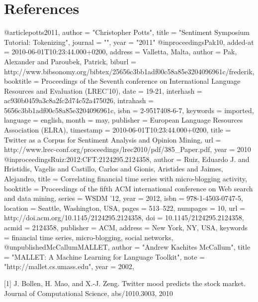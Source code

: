 \documentclass[letterpaper]{article}
\begin{document}
\section{References}
\begin{thebibliography}{99}
@article{potts2011,
    author    = "Christopher Potts",
    title     = "Sentiment Symposium Tutorial: Tokenizing",
    journal   = "",
    year      = "2011"
}
@inproceedings{Pak10,
  added-at = {2010-06-01T10:23:44.000+0200},
  address = {Valletta, Malta},
  author = {Pak, Alexander and Paroubek, Patrick},
  biburl = {http://www.bibsonomy.org/bibtex/25656c3bb1adf00c58a85e3204096961c/frederik},
  booktitle = {Proceedings of the Seventh conference on International Language Resources and Evaluation (LREC'10)},
  date = {19-21},
  interhash = {ac930b0459a3c8a2fc2d74c52a475026},
  intrahash = {5656c3bb1adf00c58a85e3204096961c},
  isbn = {2-9517408-6-7},
  keywords = {imported},
  language = {english},
  month = may,
  publisher = {European Language Resources Association (ELRA)},
  timestamp = {2010-06-01T10:23:44.000+0200},
  title = {Twitter as a Corpus for Sentiment Analysis and Opinion Mining},
  url = {http://www.lrec-conf.org/proceedings/lrec2010/pdf/385\_Paper.pdf},
  year = 2010
}
@inproceedings{Ruiz:2012:CFT:2124295.2124358,
 author = {Ruiz, Eduardo J. and Hristidis, Vagelis and Castillo, Carlos and Gionis, Aristides and Jaimes, Alejandro},
 title = {Correlating financial time series with micro-blogging activity},
 booktitle = {Proceedings of the fifth ACM international conference on Web search and data mining},
 series = {WSDM '12},
 year = {2012},
 isbn = {978-1-4503-0747-5},
 location = {Seattle, Washington, USA},
 pages = {513--522},
 numpages = {10},
 url = {http://doi.acm.org/10.1145/2124295.2124358},
 doi = {10.1145/2124295.2124358},
 acmid = {2124358},
 publisher = {ACM},
 address = {New York, NY, USA},
 keywords = {financial time series, micro-blogging, social networks},
} 
@unpublished{McCallumMALLET,
    author = "Andrew Kachites McCallum",
    title = "MALLET: A Machine Learning for Language Toolkit",
    note = "http://mallet.cs.umass.edu",
    year = 2002,
}

\end{thebibliography}

[1] J. Bollen, H. Mao, and X.-J. Zeng. Twitter mood predicts the
stock market. Journal of Computational Science,
abs/1010.3003, 2010\\
\end{document}
